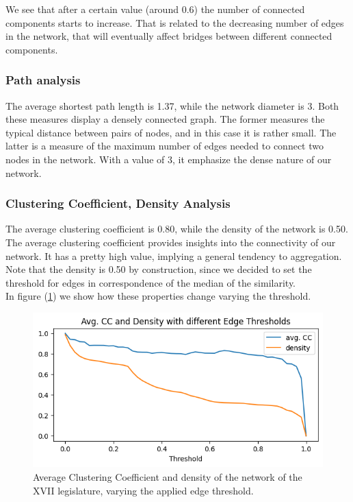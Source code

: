 We see that after a certain value (around 0.6) the number of connected components starts to increase. That is related to the decreasing number of edges in the network, that will eventually affect bridges between different connected components.

\subsubsection{Path analysis}
The average shortest path length is 1.37, while the network diameter is 3.
Both these measures display a densely connected graph.
The former measures the typical distance between pairs of nodes, and in this case it is rather small. The latter is a measure of the maximum number of edges needed to connect two nodes in the network. With a value of 3, it emphasize the dense nature of our network. 

\subsubsection{Clustering Coefficient, Density Analysis}

The average clustering coefficient is 0.80, while the density of the network is 0.50.\\
The average clustering coefficient provides insights into the connectivity of our network. It has a pretty high value, implying a general tendency to aggregation.\\
Note that the density is 0.50 by construction, since we decided to set the threshold for edges in correspondence of the median of the similarity.\\
In figure (\ref{fig:cc_dens_thresh}) we show how these properties change varying the threshold.\\

\begin{figure}[h]
  \centering
  \includegraphics[width=\linewidth]{img/cc_density_xvii_varing_tresh.png}
  \caption{Average Clustering Coefficient and density of the network of the XVII legislature, varying the applied edge threshold.}
  \label{fig:cc_dens_thresh}
\end{figure}

